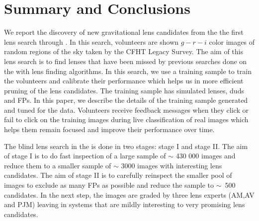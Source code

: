 \documentclass[useAMS,usenatbib,a4paper]{mn2e}
\begin{document}

\section{Summary and Conclusions}
\label{sec:conclude}

We report the discovery of new gravitational lens candidates from the
the first lens search through \sw. In this search, volunteers are shown
$g-r-i$ color images of random regions of the sky taken by the CFHT Legacy
Survey. The aim of this lens search is to find lenses that have been
missed by previous searches done on the \cfhtls with lens finding
algorithms. In this search, we use a training sample to train the
volunteers and calibrate their performance which helps us in more
efficient pruning of the lens candidates. The training sample has
simulated lenses, duds and FPs. In this paper, we describe the details
of the training sample generated and tuned for the \cfhtls data.
Volunteers receive feedback messages when they click or fail to click on
the training images during live classification of real images which
helps them remain focused and improve their performance over time.

The blind lens search in the \cfhtls is done in two stages: stage I and
stage II. The aim of stage I is to do fast inspection of a large sample
of $\sim$ 430 000 images and reduce them to a smaller sample of $\sim$
3000 images with interesting lens candidates. The aim of stage II is to
carefully reinspect the smaller pool of images to exclude as many FPs as
possible and reduce the sample to $\sim$~500 candidates. In the next
step, the images are graded by three lens experts (AM,AV and PJM)
leaving in systems that are mildly interesting to very promising lens
candidates.

\end{document}
